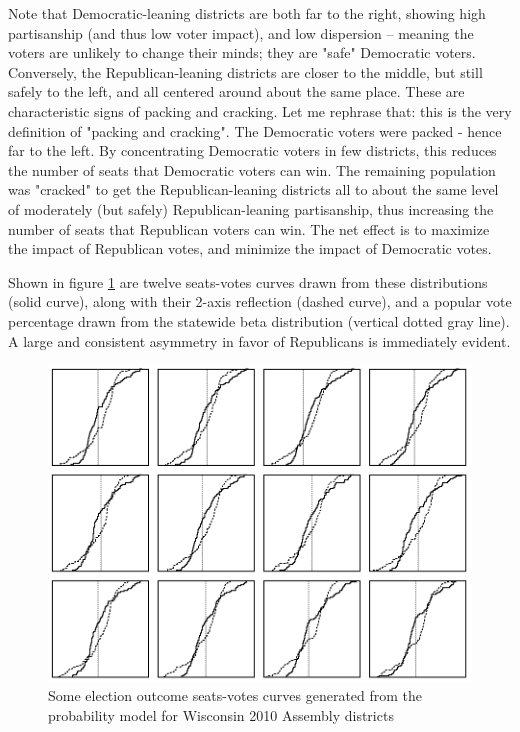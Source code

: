 \documentclass[preprint,12pt]{article}
\begin{document}
Note that Democratic-leaning districts are both far to the right, showing high partisanship (and thus low voter impact), and low dispersion -- meaning the voters are unlikely to change their minds; they are "safe" Democratic voters.  Conversely, the Republican-leaning districts are closer to the middle, but still safely to the left, and all centered around about the same place.   These are characteristic signs of packing and cracking.  Let me rephrase that: this is the very definition of "packing and cracking".  The Democratic voters were packed - hence far to the left.  By concentrating Democratic voters in few districts, this reduces the number of seats that Democratic voters can win.  The remaining population was "cracked" to get the Republican-leaning districts all to about the same level of moderately (but safely) Republican-leaning partisanship, thus increasing the number of seats that Republican voters can win.  The net effect is to maximize the impact of Republican votes, and minimize the impact of Democratic votes.
 
Shown in figure \ref{fig:SVAssembly} are twelve seats-votes curves drawn from these distributions (solid curve), along with their 2-axis reflection (dashed curve), and a popular vote percentage drawn from the statewide beta distribution (vertical dotted gray line).  A large and consistent asymmetry in favor of Republicans is immediately evident.

\begin{figure}[htb!]
    \begin{center}
        \includegraphics[scale=0.6]{../Figures/WI2010/sv_curves_assembly.png}
        \caption{Some election outcome seats-votes curves generated from the probability model for Wisconsin 2010 Assembly districts}\label{fig:SVAssembly}
    \end{center}
\end{figure}
\end{document}
